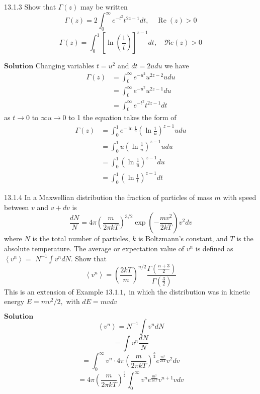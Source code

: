 \begin{mybox}{13.1.3}
Show that $\Gamma(z)$ may be written
$$\Gamma(z)=2 \int_{0}^{\infty} e^{-t^{2}} t^{2 z-1} d t, \quad \operatorname{Re}(z)>0$$
$$\Gamma(z)=\int_{0}^{1}\left[\ln \left(\frac{1}{t}\right)\right]^{z-1} d t, \quad \Re e(z)>0$$
\end{mybox}
$\boxed{\textbf{Solution}}$ Changing variables $t=u^{2}$ and $d t=2 u d u$ we have
$$
\begin{aligned}
\Gamma (z) &=\int_{0}^{\infty} e^{-u^{2}} u^{2 z-2} u d u \\
&=\int_{0}^{\infty} e^{-u^{2}} u^{2 z-1} d u \\
&=\int_{0}^{\infty} e^{-t^{2}} t^{2 z-1} d t
\end{aligned}
$$
as $t \rightarrow 0$ to $\infty u \rightarrow 0$ to 1 the equation takes the form of 
$$
\begin{aligned}
\Gamma (z) &=\int_{0}^{1} e^{-\ln \frac{1}{u}}\left(\ln \frac{1}{u}\right)^{z-1} u d u \\
&=\int_{0}^{1} u\left(\ln \frac{1}{u}\right)^{z-1} u d u \\
&=\int_{0}^{1}\left(\ln \frac{1}{u}\right)^{z-1} d u \\
&=\int_{0}^{1}\left(\ln \frac{1}{t}\right)^{z-1} d t
\end{aligned}
$$

\newpage

\begin{mybox}{13.1.4}
In a Maxwellian distribution the fraction of particles of mass $m$ with speed between $v$ and $v+d v$ is
$$
\frac{d N}{N}=4 \pi\left(\frac{m}{2 \pi k T}\right)^{3 / 2} \exp \left(-\frac{m v^{2}}{2 k T}\right) v^{2} d v
$$
where $N$ is the total number of particles, $k$ is Boltzmann's constant, and $T$ is the absolute temperature. The average or expectation value of $v^{n}$ is defined as $\left\langle v^{n}\right\rangle=$ $N^{-1} \int v^{n} d N .$ Show that
$$
\left\langle v^{n}\right\rangle=\left(\frac{2 k T}{m}\right)^{n / 2} \frac{\Gamma\left(\frac{n+3}{2}\right)}{\Gamma\left(\frac{3}{2}\right)}
$$
This is an extension of Example $13.1 .1,$ in which the distribution was in kinetic energy $E=m v^{2} / 2,$ with $d E=m v d v$
\end{mybox}
$\boxed{\textbf{Solution}}$ 
$$\left\langle v^{n}\right\rangle=N^{-1} \int v^{n} d N$$
$$=\int v^{n} \frac{d N}{N}$$
$$=\int_{0}^{\infty} v^{n} \cdot 4 \pi\left(\frac{m}{2 \pi k T}\right)^{\frac{3}{2}} e^{\frac{m^{2}}{2 k T}} v^{2} d v$$
$$=4 \pi\left(\frac{m}{2 \pi k T}\right)^{\frac{3}{2}} \int_{0}^{\infty} v^{n} e^{\frac{m^{2}}{2 k T}} v^{n+1} v d v$$

